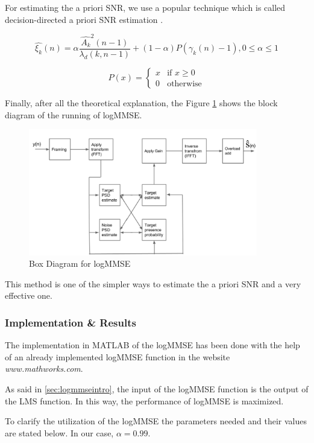 \documentclass[11pt,a4paper,english]{book}  %
\theoremstyle{definition}  %
\theoremstyle{plain}  %
\theoremstyle{remark}  %
\begin{document}
	
	For estimating the a priori SNR, we use a popular technique which is called decision-directed a priori SNR estimation \cite{speech}.
	
		\begin{equation}
		\hat{\xi_{k}}(n)= \alpha \frac{\hat{A_{k}}^2 (n-1)}{\lambda_{d} (k,n-1)} + (1-\alpha) P(\gamma_{k}(n)-1), 0 \leq \alpha \leq 1
	\end{equation}
	
	
	\[
 P(x) =
  \begin{cases}
   x & \text{if } x \geq 0 \\
   0       & \text{otherwise}
  \end{cases}
\]

Finally, after all the theoretical explanation, the Figure \ref{fig:boxesmmse} shows the block diagram of the running of logMMSE.

		
		\begin{figure}[h]
		\centering
		\includegraphics[width=10cm]{images/theory/logmmseboxes.jpg}
		\caption{Box Diagram for logMMSE}
		\label{fig:boxesmmse}
		\end{figure}
		
		This method is one of the simpler ways to estimate the a priori SNR and a very effective one.
	
	\subsubsection{Implementation \& Results}

The implementation in MATLAB of the logMMSE has been done with the help of an already implemented logMMSE function in the website \textit{www.mathworks.com}.

As said in \ref{sec:logmmseintro}, the input of the logMMSE function is the output of the LMS function. In this way, the performance of logMMSE is maximized.

To clarify the utilization of the logMMSE the parameters needed and their values are stated below. In our case, $\alpha=0.99$.
\end{document}
